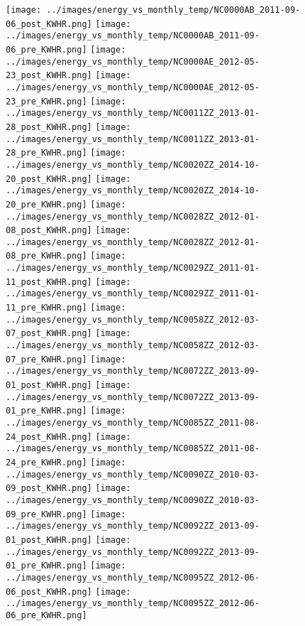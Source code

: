 \clearpage
\begin{figure}
\centering
\texttt{[image: ../images/energy\_vs\_monthly\_temp/NC0000AB\_2011-09-06\_post\_KWHR.png]}
\texttt{[image: ../images/energy\_vs\_monthly\_temp/NC0000AB\_2011-09-06\_pre\_KWHR.png]}
\texttt{[image: ../images/energy\_vs\_monthly\_temp/NC0000AE\_2012-05-23\_post\_KWHR.png]}
\texttt{[image: ../images/energy\_vs\_monthly\_temp/NC0000AE\_2012-05-23\_pre\_KWHR.png]}
\texttt{[image: ../images/energy\_vs\_monthly\_temp/NC0011ZZ\_2013-01-28\_post\_KWHR.png]}
\texttt{[image: ../images/energy\_vs\_monthly\_temp/NC0011ZZ\_2013-01-28\_pre\_KWHR.png]}
\texttt{[image: ../images/energy\_vs\_monthly\_temp/NC0020ZZ\_2014-10-20\_post\_KWHR.png]}
\texttt{[image: ../images/energy\_vs\_monthly\_temp/NC0020ZZ\_2014-10-20\_pre\_KWHR.png]}
\texttt{[image: ../images/energy\_vs\_monthly\_temp/NC0028ZZ\_2012-01-08\_post\_KWHR.png]}
\texttt{[image: ../images/energy\_vs\_monthly\_temp/NC0028ZZ\_2012-01-08\_pre\_KWHR.png]}
\texttt{[image: ../images/energy\_vs\_monthly\_temp/NC0029ZZ\_2011-01-11\_post\_KWHR.png]}
\texttt{[image: ../images/energy\_vs\_monthly\_temp/NC0029ZZ\_2011-01-11\_pre\_KWHR.png]}
\texttt{[image: ../images/energy\_vs\_monthly\_temp/NC0058ZZ\_2012-03-07\_post\_KWHR.png]}
\texttt{[image: ../images/energy\_vs\_monthly\_temp/NC0058ZZ\_2012-03-07\_pre\_KWHR.png]}
\texttt{[image: ../images/energy\_vs\_monthly\_temp/NC0072ZZ\_2013-09-01\_post\_KWHR.png]}
\texttt{[image: ../images/energy\_vs\_monthly\_temp/NC0072ZZ\_2013-09-01\_pre\_KWHR.png]}
\texttt{[image: ../images/energy\_vs\_monthly\_temp/NC0085ZZ\_2011-08-24\_post\_KWHR.png]}
\texttt{[image: ../images/energy\_vs\_monthly\_temp/NC0085ZZ\_2011-08-24\_pre\_KWHR.png]}
\texttt{[image: ../images/energy\_vs\_monthly\_temp/NC0090ZZ\_2010-03-09\_post\_KWHR.png]}
\texttt{[image: ../images/energy\_vs\_monthly\_temp/NC0090ZZ\_2010-03-09\_pre\_KWHR.png]}
\texttt{[image: ../images/energy\_vs\_monthly\_temp/NC0092ZZ\_2013-09-01\_post\_KWHR.png]}
\texttt{[image: ../images/energy\_vs\_monthly\_temp/NC0092ZZ\_2013-09-01\_pre\_KWHR.png]}
\texttt{[image: ../images/energy\_vs\_monthly\_temp/NC0095ZZ\_2012-06-06\_post\_KWHR.png]}
\texttt{[image: ../images/energy\_vs\_monthly\_temp/NC0095ZZ\_2012-06-06\_pre\_KWHR.png]}
\end{figure}
